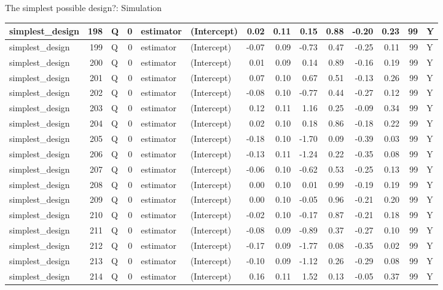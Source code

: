 \documentclass[
  11pt,
  ignorenonframetext,
]{beamer}
\begin{document}
\begin{frame}[fragile]{The simplest possible design?: Simulation}
\begin{tabular}{l|r|l|r|l|l|r|r|r|r|r|r|r|l}
\hline
simplest\_design & 198 & Q & 0 & estimator & (Intercept) & 0.02 & 0.11 & 0.15 & 0.88 & -0.20 & 0.23 & 99 & Y\\
\hline
simplest\_design & 199 & Q & 0 & estimator & (Intercept) & -0.07 & 0.09 & -0.73 & 0.47 & -0.25 & 0.11 & 99 & Y\\
\hline
simplest\_design & 200 & Q & 0 & estimator & (Intercept) & 0.01 & 0.09 & 0.14 & 0.89 & -0.16 & 0.19 & 99 & Y\\
\hline
simplest\_design & 201 & Q & 0 & estimator & (Intercept) & 0.07 & 0.10 & 0.67 & 0.51 & -0.13 & 0.26 & 99 & Y\\
\hline
simplest\_design & 202 & Q & 0 & estimator & (Intercept) & -0.08 & 0.10 & -0.77 & 0.44 & -0.27 & 0.12 & 99 & Y\\
\hline
simplest\_design & 203 & Q & 0 & estimator & (Intercept) & 0.12 & 0.11 & 1.16 & 0.25 & -0.09 & 0.34 & 99 & Y\\
\hline
simplest\_design & 204 & Q & 0 & estimator & (Intercept) & 0.02 & 0.10 & 0.18 & 0.86 & -0.18 & 0.22 & 99 & Y\\
\hline
simplest\_design & 205 & Q & 0 & estimator & (Intercept) & -0.18 & 0.10 & -1.70 & 0.09 & -0.39 & 0.03 & 99 & Y\\
\hline
simplest\_design & 206 & Q & 0 & estimator & (Intercept) & -0.13 & 0.11 & -1.24 & 0.22 & -0.35 & 0.08 & 99 & Y\\
\hline
simplest\_design & 207 & Q & 0 & estimator & (Intercept) & -0.06 & 0.10 & -0.62 & 0.53 & -0.25 & 0.13 & 99 & Y\\
\hline
simplest\_design & 208 & Q & 0 & estimator & (Intercept) & 0.00 & 0.10 & 0.01 & 0.99 & -0.19 & 0.19 & 99 & Y\\
\hline
simplest\_design & 209 & Q & 0 & estimator & (Intercept) & 0.00 & 0.10 & -0.05 & 0.96 & -0.21 & 0.20 & 99 & Y\\
\hline
simplest\_design & 210 & Q & 0 & estimator & (Intercept) & -0.02 & 0.10 & -0.17 & 0.87 & -0.21 & 0.18 & 99 & Y\\
\hline
simplest\_design & 211 & Q & 0 & estimator & (Intercept) & -0.08 & 0.09 & -0.89 & 0.37 & -0.27 & 0.10 & 99 & Y\\
\hline
simplest\_design & 212 & Q & 0 & estimator & (Intercept) & -0.17 & 0.09 & -1.77 & 0.08 & -0.35 & 0.02 & 99 & Y\\
\hline
simplest\_design & 213 & Q & 0 & estimator & (Intercept) & -0.10 & 0.09 & -1.12 & 0.26 & -0.29 & 0.08 & 99 & Y\\
\hline
simplest\_design & 214 & Q & 0 & estimator & (Intercept) & 0.16 & 0.11 & 1.52 & 0.13 & -0.05 & 0.37 & 99 & Y\\

\end{tabular}
\end{frame}
\end{document}
